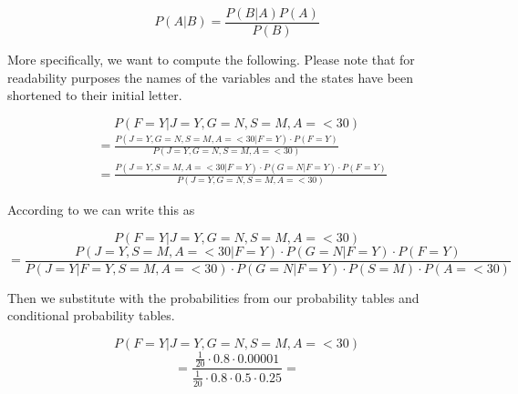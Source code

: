 \begin{equation}
P(A|B) = \frac{P(B|A)P(A)}{P(B)}
\end{equation}

More specifically, we want to compute the following. Please note that for readability purposes the names of the variables and the states have been shortened to their initial letter.

\begin{equation*}
P(F=Y|J = Y, G = N, S = M, A = < 30) 
\end{equation*}
\begin{equation*}
\begin{split}
&= \frac{P(J = Y, G = N, S = M, A = < 30|F=Y) \cdot P(F=Y)}{P(J = Y, G = N, S = M, A = < 30)} \\
&= \frac{P(J = Y, S = M, A = < 30|F=Y) \cdot P(G=N|F=Y) \cdot P(F=Y)}{P(J = Y, G = N, S = M, A = < 30)}
\end{split}
\end{equation*}

According to  we can write this as

\begin{equation*}
P(F=Y|J = Y, G = N, S = M, A = < 30) 
\end{equation*}
\begin{equation*}
= \frac{P(J = Y, S = M, A = < 30|F=Y) \cdot P(G=N|F=Y) \cdot P(F=Y)}{P(J=Y|F=Y,S=M,A=<30) \cdot P(G=N|F=Y) \cdot P(S=M) \cdot P(A=<30)}
\end{equation*}

Then we substitute with the probabilities from our probability tables and conditional probability tables.

\begin{equation*}
P(F=Y|J = Y, G = N, S = M, A = < 30) 
\end{equation*}
\begin{equation*}
= \frac{\frac{1}{20} \cdot 0.8 \cdot 0.00001}{\frac{1}{20} \cdot 0.8 \cdot 0.5 \cdot 0.25} = 
\end{equation*}
